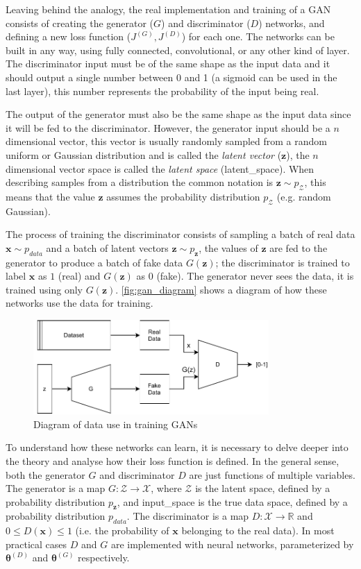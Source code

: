 Leaving behind the analogy, the real implementation and training of a \gls{GAN} consists of creating the generator ($G$) and discriminator ($D$) networks, and defining a new loss function ($J^{(G)}, J^{(D)}$) for each one. The networks can be built in any way, using fully connected, convolutional, or any other kind of layer. The discriminator input must be of the same shape as the input data and it should output a single number between 0 and 1 (a sigmoid can be used in the last layer), this number represents the probability of the input being real.

The output of the generator must also be the same shape as the input data since it will be fed to the discriminator. However, the generator input should be a $n$ dimensional vector, this vector is usually randomly sampled from a random uniform or Gaussian distribution and is called the \textit{latent vector} ($\bm{z}$), the $n$ dimensional vector space is called the \textit{latent space} (\gls{latent_space}). When describing samples from a distribution the common notation is $\bm{z}\sim p_{\mathcal{Z}}$, this means that the value $\bm{z}$ assumes the probability distribution $p_{\mathcal{Z}}$ (e.g. random Gaussian).

The process of training the discriminator consists of sampling a batch of real data $\bm{x}\sim p_{data}$ and a batch of latent vectors $\bm{z}\sim p_{\bm{z}}$, the values of $\bm{z}$ are fed to the generator to produce a batch of fake data $G(\bm{z})$; the discriminator is trained to label $\bm{x}$ as $1$ (real) and $G(\bm{z})$ as $0$ (fake). The generator never sees the data, it is trained using only $G(\bm{z})$. \autoref{fig:gan_diagram} shows a diagram of how these networks use the data for training.
\begin{figure}[hbt]
    \centering
    \includegraphics[width=0.8\textwidth]{chapters/GANs/figures/gan.pdf}
    \caption{Diagram of data use in training GANs}
    \label{fig:gan_diagram}
\end{figure}

To understand how these networks can learn, it is necessary to delve deeper into the theory and analyse how their loss function is defined. In the general sense, both the generator $G$ and discriminator $D$ are just functions of multiple variables. The generator is a map $G:\mathcal{Z} \to \mathcal{X}$, where $\mathcal{Z}$ is the latent space, defined by a probability distribution $p_{\bm{z}}$, and \gls{input_space} is the true data space, defined by a probability distribution $p_{data}$. The discriminator is a map $D:\mathcal{X} \to \mathbb{R}$ and $0 \leq D(\bm{x}) \leq 1$ (i.e. the probability of $\bm{x}$ belonging to the real data). In most practical cases $D$ and $G$ are implemented with neural networks, parameterized by $\bm{\theta}^{(D)}$ and $\bm{\theta}^{(G)}$ respectively.

